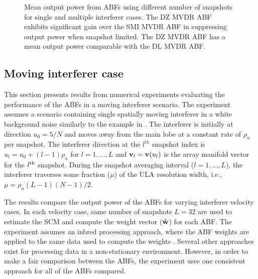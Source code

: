 \begin{figure*}[!hp]
\centering
{}
\hfil
{}
\caption[Mean output power from ABFs using different number of
snapshots for single and multiple interferer cases]{Mean output power
  from ABFs using different number of snapshots for single and
  multiple interferer cases. The DZ MVDR ABF exhibits significant gain
  over the SMI MVDR ABF in suppressing output power when snapshot
  limited. The DZ MVDR ABF has a mean output power comparable with the
  DL MVDR ABF.}
\label{fig:pout-snapshot}
\end{figure*}


\subsection{Moving interferer case} 
\label{sec:moving-interferer}
This section presents results from numerical experiments evaluating
the performance of the ABFs in a moving interferer scenario. The
experiment assumes a scenario containing single spatially moving
interferer in a white background noise similarly to the
example in \cite[Sec. 4]{cox2000mrabf}. The interferer is initially at
direction $u_0 = 5/N$ and moves away from the main lobe at a constant
rate of $\rho_u$ per snapshot. The interferer direction at the
$l^{th}$ snapshot index is $u_l = u_0 + (l-1) \rho_u $ for
$l = 1, \ldots, L$ and ${\bf v}_l = {\bf v}(u_l)$ is the array manifold
vector for the $l^{\rm th}$ snapshot. During the snapshot averaging
interval ($l = 1,\ldots, L$), the interferer traverses some fraction
($\mu$) of the ULA resolution width, i.e.,
$\mu = \rho_u (L-1)(N - 1)/2$.

The results compare the output power of the ABFs for
varying interferer velocity cases. In each velocity case, same
number of snapshots $L = 32$ are used to estimate the SCM and compute
the weight vector ($\hat{{\bf w}}$) for each ABF. The experiment assumes an
inbred processing approach, where the ABF weights are applied to the
same data used to compute the weights \cite{cox2002adaptive}. Several
other approaches exist for processing data in a non-stationary
environment. However, in order to make a fair comparison between the
ABFs, the experiment uses one consistent approach for all of the ABFs
compared.

